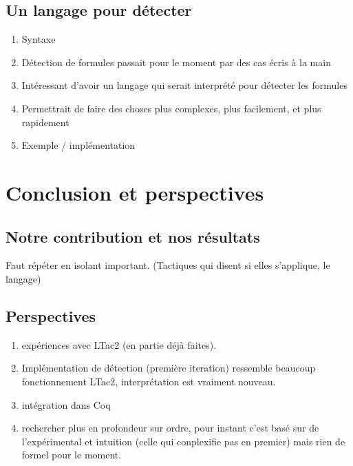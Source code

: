 \documentclass[titlepage,draft]{article}
\begin{document}
\subsection{Un langage pour détecter}
\begin{enumerate}
    \item Syntaxe
    \item Détection de formules passait pour le moment par des cas écris à la main
    \item Intéressant d'avoir un langage qui serait interprété pour détecter les formules
    \item Permettrait de faire des choses plus complexes, plus facilement, et plus rapidement
    \item Exemple / implémentation
\end{enumerate}


\section{Conclusion et perspectives}
\subsection{Notre contribution et nos résultats}
Faut répéter en isolant important. (Tactiques qui disent si elles s'applique, le langage)
\subsection{Perspectives}
\begin{enumerate}
    \item expériences avec LTac2 (en partie déjà faites).
    \item Implémentation de détection (première iteration) ressemble beaucoup fonctionnement LTac2, interprétation est vraiment nouveau.
    \item intégration dans Coq
    \item rechercher plus en profondeur sur ordre, pour instant c'est basé sur de l'expérimental et intuition (celle qui conplexifie pas en premier) mais rien de formel pour le moment.
\end{enumerate}
\end{document}
